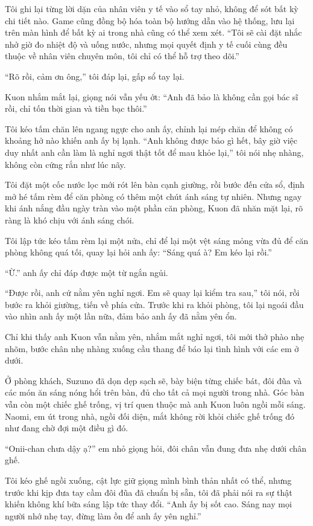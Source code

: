 \documentclass[../main.tex]{subfiles}
\begin{document}
Tôi ghi lại từng lời dặn của nhân viên y tế vào sổ tay nhỏ, không để sót bất kỳ chi tiết nào. Game cũng đồng bộ hóa toàn bộ hướng dẫn vào hệ thống, lưu lại trên màn hình để bất kỳ ai trong nhà cũng có thể xem xét. ``Tôi sẽ cài đặt nhắc nhở giờ đo nhiệt độ và uống nước, nhưng mọi quyết định y tế cuối cùng đều thuộc về nhân viên chuyên môn, tôi chỉ có thể hỗ trợ theo dõi.'' 

``Rõ rồi, cảm ơn ông,'' tôi đáp lại, gấp sổ tay lại.

Kuon nhắm mắt lại, giọng nói vẫn yếu ớt: ``Anh đã bảo là không cần gọi bác sĩ rồi, chỉ tốn thời gian và tiền bạc thôi.''

Tôi kéo tấm chăn lên ngang ngực cho anh ấy, chỉnh lại mép chăn để không có khoảng hở nào khiến anh ấy bị lạnh. ``Anh không được bảo gì hết, bây giờ việc duy nhất anh cần làm là nghỉ ngơi thật tốt để mau khỏe lại,'' tôi nói nhẹ nhàng, không còn cứng rắn như lúc nãy.

Tôi đặt một cốc nước lọc mới rót lên bàn cạnh giường, rồi bước đến cửa sổ, định mở hé tấm rèm để căn phòng có thêm một chút ánh sáng tự nhiên. Nhưng ngay khi ánh nắng đầu ngày tràn vào một phần căn phòng, Kuon đã nhăn mặt lại, rõ ràng là khó chịu với ánh sáng chói.

Tôi lập tức kéo tấm rèm lại một nửa, chỉ để lại một vệt sáng mỏng vừa đủ để căn phòng không quá tối, quay lại hỏi anh ấy: ``Sáng quá à? Em kéo lại rồi.''

``Ừ.'' anh ấy chỉ đáp được một từ ngắn ngủi.

``Được rồi, anh cứ nằm yên nghỉ ngơi. Em sẽ quay lại kiểm tra sau,'' tôi nói, rồi bước ra khỏi giường, tiến về phía cửa. Trước khi ra khỏi phòng, tôi lại ngoái đầu vào nhìn anh ấy một lần nữa, đảm bảo anh ấy đã nằm yên ổn.

Chỉ khi thấy anh Kuon vẫn nằm yên, nhắm mắt nghỉ ngơi, tôi mới thở phào nhẹ nhõm, bước chân nhẹ nhàng xuống cầu thang để báo lại tình hình với các em ở dưới.

\ct

Ở phòng khách, Suzuno đã dọn dẹp sạch sẽ, bày biện từng chiếc bát, đôi đũa và các món ăn sáng nóng hổi trên bàn, đủ cho tất cả mọi người trong nhà. Góc bàn vẫn còn một chiếc ghế trống, vị trí quen thuộc mà anh Kuon luôn ngồi mỗi sáng. Naomi, em út trong nhà, ngồi đối diện, mắt không rời khỏi chiếc ghế trống đó như đang chờ đợi một điều gì đó.

``Onii-chan chưa dậy ạ?'' em nhỏ giọng hỏi, đôi chân vẫn đung đưa nhẹ dưới chân ghế.

Tôi kéo ghế ngồi xuống, cật lực giữ giọng mình bình thản nhất có thể, nhưng trước khi kịp đưa tay cầm đôi đũa đã chuẩn bị sẵn, tôi đã phải nói ra sự thật khiến không khí bữa sáng lập tức thay đổi. ``Anh ấy bị sốt cao. Sáng nay mọi người nhớ nhẹ tay, đừng làm ồn để anh ấy yên nghỉ.''
\end{document}

